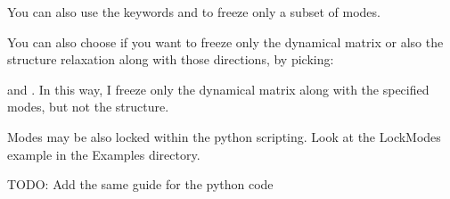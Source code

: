 \documentclass[a4paper,11pt,english]{sphinxmanual}
\begin{document}
\sphinxAtStartPar
You can also use the keywords  and  to freeze only a subset of modes.

\sphinxAtStartPar
You can also choose if you want to freeze only the dynamical matrix or also the structure relaxation along with those directions, by picking:

\sphinxAtStartPar
{} and . In this way, I freeze only the dynamical matrix along with the specified modes, but not the structure.

\sphinxAtStartPar
Modes may be also locked within the python scripting. Look at the LockModes example in the Examples directory.

\sphinxAtStartPar
TODO: Add the same guide for the python code
\end{document}
